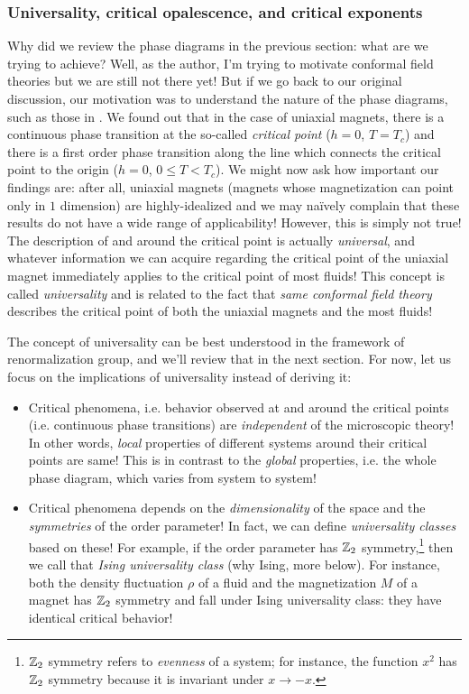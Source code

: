 \documentclass[12pt]{article}
\numberwithin{equation}{section}
\def\naively{naïvely }
\begin{document}
\subsubsection{Universality, critical opalescence, and critical exponents}
Why did we review the phase diagrams in the previous section: what are we trying to achieve? Well, as the author, I'm trying to motivate conformal field theories but we are still not there yet! But if we go back to our original discussion, our motivation was to understand the nature of the phase diagrams, such as those in \figref{\ref{fig: phase diagram}}. We found out that in the case of uniaxial magnets, there is a continuous phase transition at the so-called \emph{critical point} (\mbox{$h=0$}, \mbox{$T=T_c$}) and there is a first order phase transition along the line which connects the critical point to the origin (\mbox{$h=0$}, \mbox{$0\le T< T_c$}). We might now ask how important our findings are: after all, uniaxial magnets (magnets whose magnetization can point only in $1$ dimension) are highly-idealized and we may \naively complain that these results do not have a wide range of applicability! However, this is simply not true! The description of and around the critical point is actually \emph{universal}, and whatever information we can acquire regarding the critical point of the uniaxial magnet immediately applies to the critical point of most fluids! This concept is called \emph{universality} and is related to the fact that \emph{same conformal field theory} describes the critical point of both the uniaxial magnets and the most fluids!

The concept of universality can be best understood in the framework of renormalization group, and we'll review that in the next section. For now, let us focus on the implications of universality instead of deriving it:
\begin{itemize}
\label{items: implications of universality}
	\item Critical phenomena, i.e. behavior observed at and around the critical points (i.e. continuous phase transitions) are \emph{independent} of the microscopic theory! In other words, \emph{local} properties of  different systems around their critical points are same! This is in contrast to the \emph{global} properties, i.e. the whole phase diagram, which varies from system to system!
	\item Critical phenomena depends on the \emph{dimensionality} of the space  and the \emph{symmetries} of the order parameter! In fact, we can define \emph{universality classes} based on these! For example, if the order parameter has $\mathbb{Z}_2$ symmetry,\footnote{$\mathbb{Z}_2$ symmetry refers to \emph{evenness} of a system; for instance, the function $x^2$ has $\mathbb{Z}_2$ symmetry because it is invariant under $x\rightarrow -x$.} then we call that \emph{Ising universality class} (why Ising, more below). For instance, both the density fluctuation $\rho$ of a fluid and the magnetization $M$ of a magnet has $\mathbb{Z}_2$ symmetry and fall under Ising universality class: they have identical critical behavior!
\end{itemize}
\end{document}
